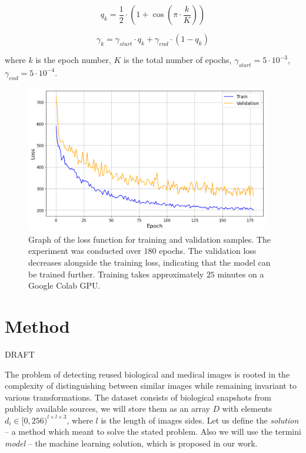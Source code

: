 \documentclass{article}
\begin{document}
$$ q_k = \frac{1}{2} \cdot (1 + \cos(\pi \cdot \frac{k}{K})) $$

$$ \gamma_{k} = \gamma_{start} \cdot q_k + \gamma_{end} \cdot (1 - q_k) $$

where $k$ is the epoch number, $K$ is the total number of epochs, 
$\gamma_{start} = 5 \cdot 10^{-3}$, $\gamma_{end} = 5 \cdot 10^{-4}$. 

\begin{figure}[htbp]
    \centering
    \includegraphics[width=0.95\textwidth]{figures/BT_blood-cells-256_experiment.png}
    \caption{Graph of the loss function for training and validation samples. 
    The experiment was conducted over $180$ epochs. 
    The validation loss decreases alongside the training loss, indicating that 
    the model can be trained further. 
    Training takes approximately $25$ minutes on a Google Colab GPU. 
    }
    \label{fig:experiment}
\end{figure}

\section{Method}

DRAFT

The problem of detecting reused biological and medical images is rooted in the complexity of
distinguishing between similar images while remaining invariant to various transformations.
The dataset consists of biological snapshots from publicly available sources, we will 
store them as an array $D$ with elements $d_i \in [0, 256)^{l \times l \times 3}$, where 
$l$ is the length of images sides. 
Let us define the \textit{solution} -- a method which meant to solve the stated problem.
Also we will use the termini \textit{model} -- the machine learning solution, which is 
proposed in our work.
\end{document}
